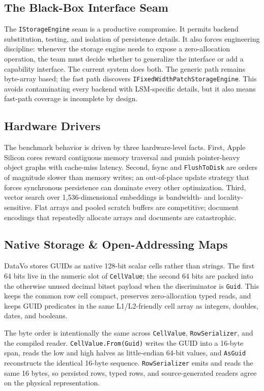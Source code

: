 \documentclass[11pt]{article}
\begin{document}
\subsection{The Black-Box Interface Seam}
The \texttt{IStorageEngine} seam is a productive compromise. It permits backend substitution, testing, and isolation of persistence details. It also forces engineering discipline: whenever the storage engine needs to expose a zero-allocation operation, the team must decide whether to generalize the interface or add a capability interface. The current system does both. The generic path remains byte-array based; the fast path discovers \texttt{IFixedWidthPatchStorageEngine}. This avoids contaminating every backend with LSM-specific details, but it also means fast-path coverage is incomplete by design.

\subsection{Hardware Drivers}
The benchmark behavior is driven by three hardware-level facts. First, Apple Silicon cores reward contiguous memory traversal and punish pointer-heavy object graphs with cache-miss latency. Second, fsync and \texttt{FlushToDisk} are orders of magnitude slower than memory writes; an out-of-place update strategy that forces synchronous persistence can dominate every other optimization. Third, vector search over 1,536-dimensional embeddings is bandwidth- and locality-sensitive. Flat arrays and pooled scratch buffers are competitive; document encodings that repeatedly allocate arrays and documents are catastrophic.

\subsection{Native Storage \& Open-Addressing Maps}
DataVo stores GUIDs as native 128-bit scalar cells rather than strings. The first 64 bits live in the numeric slot of \texttt{CellValue}; the second 64 bits are packed into the otherwise unused decimal bitset payload when the discriminator is \texttt{Guid}. This keeps the common row cell compact, preserves zero-allocation typed reads, and keeps GUID predicates in the same L1/L2-friendly cell array as integers, doubles, dates, and booleans.

The byte order is intentionally the same across \texttt{CellValue}, \texttt{RowSerializer}, and the compiled reader. \texttt{CellValue.From(Guid)} writes the GUID into a 16-byte span, reads the low and high halves as little-endian 64-bit values, and \texttt{AsGuid} reconstructs the identical 16-byte sequence. \texttt{RowSerializer} emits and reads the same 16 bytes, so persisted rows, typed rows, and source-generated readers agree on the physical representation.
\end{document}
